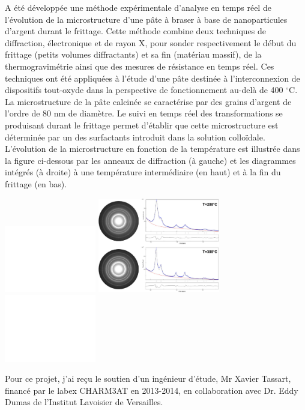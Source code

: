 A été développée une méthode expérimentale d'analyse en temps réel de l'évolution de la microstructure d'une pâte à braser à base de nanoparticules d'argent durant le frittage. Cette méthode combine deux techniques de diffraction, électronique et de rayon X, pour sonder respectivement le début du frittage (petits volumes diffractants) et sa fin (matériau massif), de la thermogravimétrie ainsi que des mesures de résistance en temps réel. Ces techniques ont été appliquées à l'étude d'une pâte destinée à l'interconnexion de dispositifs tout-oxyde dans la perspective de fonctionnement au-delà de 400 $^\circ$C. La microstructure de la pâte calcinée se caractérise par des grains d'argent de l'ordre de 80 nm de diamètre. Le suivi en temps réel des transformations se produisant durant le frittage permet d'établir que cette microstructure est déterminée par un des surfactants introduit dans la solution colloïdale.
L'évolution de la microstructure en fonction de la température est illustrée dans la figure ci-dessous par les anneaux de diffraction (à gauche) et les diagrammes intégrés (à droite) à une température intermédiaire (en haut) et à la fin du frittage (en bas).
\par
\includegraphics[width=0.3\textwidth]{./figures/cadre_blanc.eps}
\includegraphics[width=0.4\textwidth]{./figures/ColCoNAg.eps}
\includegraphics[width=0.3\textwidth]{./figures/cadre_blanc.eps}


Pour ce projet, j'ai reçu le soutien d'un ingénieur d'étude, Mr Xavier Tassart, financé par le labex CHARM3AT en 2013-2014, en collaboration avec Dr. Eddy Dumas de l'Institut Lavoisier de Versailles.

